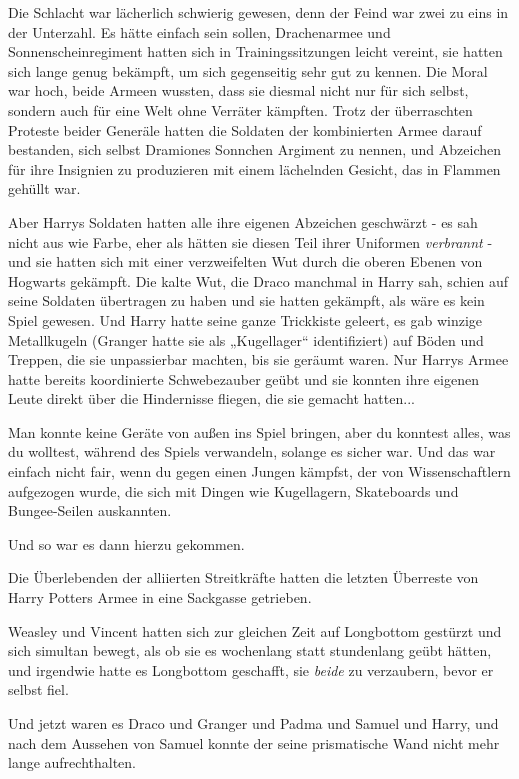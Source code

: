 {Die Schlacht war lächerlich schwierig gewesen, denn der Feind war zwei zu eins in der Unterzahl. Es hätte einfach sein sollen, Drachenarmee und Sonnenscheinregiment hatten sich in Trainingssitzungen leicht vereint, sie hatten sich lange genug bekämpft, um sich gegenseitig sehr gut zu kennen. Die Moral war hoch, beide Armeen wussten, dass sie diesmal nicht nur für sich selbst, sondern auch für eine Welt ohne Verräter kämpften. Trotz der überraschten Proteste beider Generäle hatten die Soldaten der kombinierten Armee darauf bestanden, sich selbst Dramiones Sonnchen Argiment zu nennen, und Abzeichen für ihre Insignien zu produzieren mit einem lächelnden Gesicht, das in Flammen gehüllt war.

Aber Harrys Soldaten hatten alle ihre eigenen Abzeichen geschwärzt - es sah nicht aus wie Farbe, eher als hätten sie diesen Teil ihrer Uniformen \emph{verbrannt} - und sie hatten sich mit einer verzweifelten Wut durch die oberen Ebenen von Hogwarts gekämpft. Die kalte Wut, die Draco manchmal in Harry sah, schien auf seine Soldaten übertragen zu haben und sie hatten gekämpft, als wäre es kein Spiel gewesen. Und Harry hatte seine ganze Trickkiste geleert, es gab winzige Metallkugeln (Granger hatte sie als „Kugellager“ identifiziert) auf Böden und Treppen, die sie unpassierbar machten, bis sie geräumt waren. Nur Harrys Armee hatte bereits koordinierte Schwebezauber geübt und sie konnten ihre eigenen Leute direkt über die Hindernisse fliegen, die sie gemacht hatten...

Man konnte keine Geräte von außen ins Spiel bringen, aber du konntest alles, was du wolltest, während des Spiels verwandeln, solange es sicher war. Und das war einfach nicht fair, wenn du gegen einen Jungen kämpfst, der von Wissenschaftlern aufgezogen wurde, die sich mit Dingen wie Kugellagern, Skateboards und Bungee-Seilen auskannten.

Und so war es dann hierzu gekommen.

Die Überlebenden der alliierten Streitkräfte hatten die letzten Überreste von Harry Potters Armee in eine Sackgasse getrieben.

Weasley und Vincent hatten sich zur gleichen Zeit auf Longbottom gestürzt und sich simultan bewegt, als ob sie es wochenlang statt stundenlang geübt hätten, und irgendwie hatte es Longbottom geschafft, sie \emph{beide} zu verzaubern, bevor er selbst fiel.

Und jetzt waren es Draco und Granger und Padma und Samuel und Harry, und nach dem Aussehen von Samuel konnte der seine prismatische Wand nicht mehr lange aufrechthalten.

}
